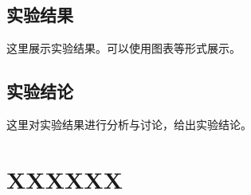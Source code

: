 \documentclass[a4paper,12pt]{ctexart}
\begin{document}
\subsection{实验结果}
这里展示实验结果。可以使用图表等形式展示。

\subsection{实验结论}
这里对实验结果进行分析与讨论，给出实验结论。

\newpage
\section{XXXXXX}
\end{document}
